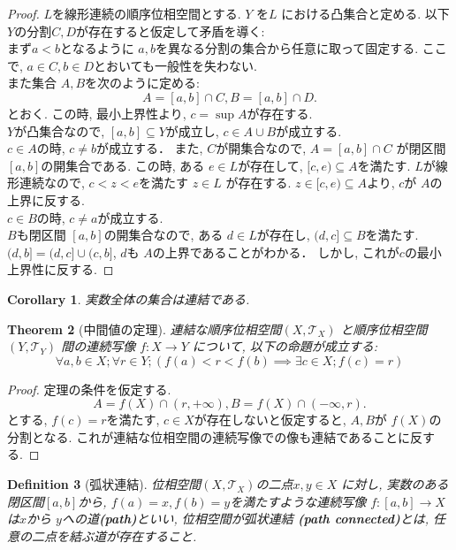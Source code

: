 \documentclass[dvipdfmx]{jbook}
\newtheorem{theorem}{Theorem}[section]
\newtheorem{corollary}[theorem]{Corollary}
\newtheorem{definition}[theorem]{Definition}
\theoremstyle{remark}
\theoremstyle{plain}
\begin{document}
\begin{proof}
	$L$を線形連続の順序位相空間とする. 
	$Y$ を$L$ における凸集合と定める. 
	以下$Y$の分割$C,D$が存在すると仮定して矛盾を導く:\\ 
	まず$a<b$となるように $a,b$を異なる分割の集合から任意に取って固定する. 
	ここで, $a \in C, b \in D$とおいても一般性を失わない.\\
	また集合 $A,B$を次のように定める:
	 \[
		 A=[a,b] \cap C, B= [a,b] \cap D
	.\] 
	とおく. この時, 最小上界性より, $c=\sup A$が存在する.\\
	$Y$が凸集合なので,  $[a,b] \subseteq Y$が成立し, $ c \in A \cup B$が成立する.\\
	$c\in A$の時,  $c \neq b$が成立する．
	また, $C$が開集合なので, $A=[a,b] \cap C$ が閉区間$[a,b]$の開集合である. 
	この時, ある $e \in L$が存在して,  $[c,e) \subseteq A$を満たす.
	$L$が線形連続なので,  $c<z<e$を満たす $z \in L$ が存在する. 
	$z \in [c,e) \subseteq A$より, $c$が $A$の上界に反する.\\
	 $c \in B$の時,  $c \neq a$が成立する. \\
	 $B$も閉区間 $[a,b]$の開集合なので, ある $d \in L$が存在し,  $(d,c] \subseteq B$を満たす.
	 $(d,b] = (d,c] \cup (c ,b]$, $d$も $A$の上界であることがわかる．
	 しかし, これが$c$の最小上界性に反する.
\end{proof}

\begin{corollary}
	実数全体の集合は連結である.
\end{corollary}

\begin{theorem}[中間値の定理]
	連結な順序位相空間$\left( X ,\mathcal{T}_X \right) $ と順序位相空間$ \left( Y, \mathcal{T}_Y \right) $ 間の連続写像
	$f: X \to Y$ について, 以下の命題が成立する: 
	$$
	\forall a,b \in X; \forall r \in Y; \left( f(a)<r< f(b) \implies \exists c \in X ;f(c) =r \right)
	$$
\end{theorem}

\begin{proof}
	定理の条件を仮定する. 
	\[
	A=f(X) \cap (r, + \infty), B= f(X) \cap (- \infty, r)
	.\]
	とする, $f(c) =r$を満たす,  $c \in X$が存在しないと仮定すると,  $A,B$が $f(X)$の分割となる. 
	これが連結な位相空間の連続写像での像も連結であることに反する.
\end{proof}

\begin{definition}[弧状連結]
	位相空間$ \left( X , \mathcal{T}_X \right) $の二点$x,y \in X$ に対し, 
	実数のある閉区間$[a,b]$から,  $f(a) =x,f(b) = y$を満たすような連続写像 
	$f: [a,b] \to X$は$x$から $y$への道\textbf{(path)}といい, 
	位相空間が弧状連結 \textbf{(path connected)}とは, 任意の二点を結ぶ道が存在すること.
\end{definition}
\end{document}
